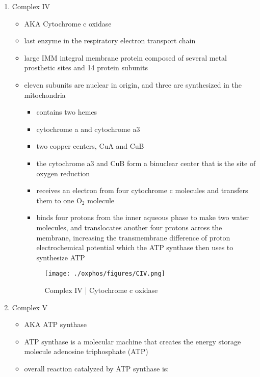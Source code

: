 \documentclass{scrartcl}
\begin{document}
\begin{enumerate}
\begin{itemize}
{\small{}}
\end{itemize}

\item Complex IV
\label{sec:org6118b5c}
\begin{itemize}
\item AKA Cytochrome c oxidase
\item last enzyme in the respiratory electron transport chain
\item large IMM integral membrane protein composed of several metal prosthetic sites and 14 protein subunits
\item eleven subunits are nuclear in origin, and three are synthesized in the mitochondria
\begin{itemize}
\item contains two hemes
\item cytochrome a and cytochrome a3
\item two copper centers, CuA and CuB
\item the cytochrome a3 and CuB form a binuclear center that is the site of oxygen reduction
\item receives an electron from four cytochrome c molecules and
transfers them to one O\(_{\text{2}}\) molecule
\end{itemize}

{\small{}}

\begin{itemize}
\item binds four protons from the inner aqueous phase to make two water
molecules, and translocates another four protons across the
membrane, increasing the transmembrane difference of proton
electrochemical potential which the ATP synthase then uses to
synthesize ATP
\end{itemize}

\begin{figure}[htbp]
\centering
\texttt{[image: ./oxphos/figures/CIV.png]}
\caption[cIV]{\label{fig:orgefb5651}
Complex IV | Cytochrome c oxidase}
\end{figure}
\end{itemize}

\item Complex V
\label{sec:org20dca86}
\begin{itemize}
\item AKA ATP synthase
\item ATP synthase is a molecular machine that creates the energy storage
molecule adenosine triphosphate (ATP)
\item overall reaction catalyzed by ATP synthase is:
\end{itemize}


\end{enumerate}
\end{document}
